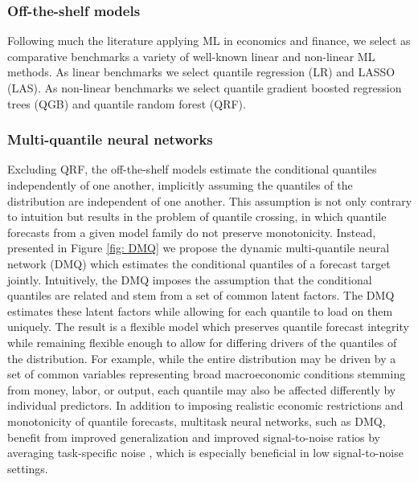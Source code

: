 \documentclass[12pt]{article}
\begin{document}
\subsubsection{Off-the-shelf models}

Following much the literature applying ML in economics and finance, we select as comparative benchmarks a variety of well-known linear and non-linear ML methods. As linear benchmarks we select quantile regression (LR) and LASSO (LAS).
As non-linear benchmarks we select quantile gradient boosted regression trees (QGB) and quantile random forest (QRF). 

\subsubsection{Multi-quantile neural networks}

Excluding QRF, the off-the-shelf models estimate the conditional quantiles independently of one another, implicitly assuming the quantiles of the distribution are independent of one another. This assumption is not only contrary to intuition but results in the problem of quantile crossing, in which quantile forecasts from a given model family do not preserve monotonicity. Instead, presented in Figure \ref{fig: DMQ} we propose the dynamic multi-quantile neural network (DMQ) which estimates the conditional quantiles of a forecast target jointly. Intuitively, the DMQ imposes the assumption that the conditional quantiles are related and stem from a set of common latent factors. The DMQ estimates these latent factors while allowing for each quantile to load on them uniquely. The result is a flexible model which preserves quantile forecast integrity while remaining flexible enough to allow for differing drivers of the quantiles of the distribution. For example, while the entire distribution may be driven by a set of common variables representing broad macroeconomic conditions stemming from money, labor, or output, each quantile may also be affected differently by individual predictors. In addition to imposing realistic economic restrictions and monotonicity of quantile forecasts, multitask neural networks, such as DMQ, benefit from improved generalization \citep{caruanaMultitaskLearning1997} and improved signal-to-noise ratios by averaging task-specific noise \citep{ruderOverviewMultiTaskLearning2017}, which is especially beneficial in low signal-to-noise settings.
\end{document}
